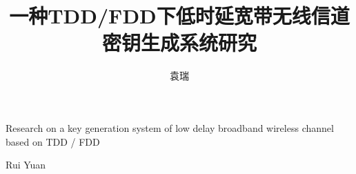 \documentclass[master]{seuthesis} %
\begin{document}

\title{一种TDD/FDD下低时延宽带无线信道密钥生成系统研究}{}{Research on a key generation system of low delay broadband wireless channel based on TDD / FDD}{}
\author{袁瑞}{Rui Yuan}

\address{东南大学}
\maketitle
\end{document}
